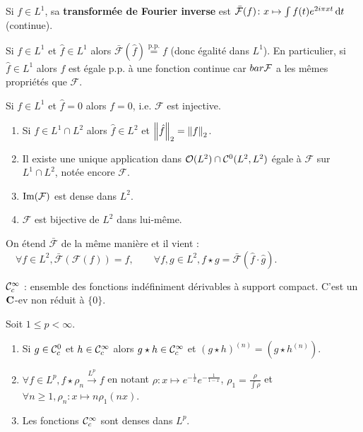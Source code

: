 \begin{defn}
	Si $f \in L^1$, sa \textbf{transformée de Fourier inverse} est $\bar{\mathcal{F}}(f) \colon x \mapsto \int f(t) e^{2i\pi xt} \mathop{}\mathopen{}\mathrm{d} t$ (continue).
\end{defn}

\begin{thm}
	Si $f \in L^1$ et $\hat{f} \in L^1$ alors $\bar{\mathcal{F}}(\hat{f}) \overset{\text{p.p.}}{=} f$ (donc égalité dans $L^1$).
	En particulier, si $\hat{f} \in L^1$ alors $f$ est égale p.p. à une fonction continue car $\\bar{\mathcal{F}}$ a les mêmes propriétés que $\mathcal{F}$.
\end{thm}

\begin{cor}
	Si $f \in L^1$ et $\hat{f} = 0$ alors $f = 0$, i.e. $\mathcal{F}$ est injective.
\end{cor}

\begin{thm}[Extension à $L^2$]
	\begin{enumerate}
		\item Si $f \in L^1 \cap L^2$ alors $\hat{f} \in L^2$ et $\left\lVert\hat{f}\right\rVert_2 = \left\lVert f\right\rVert_2$.
		\item Il existe une unique application dans $\mathcal{O}(L^2) \cap \mathcal{C}^0(L^2,L^2)$ égale à $\mathcal{F}$ sur $L^1 \cap L^2$, notée encore $\mathcal{F}$.
		\item $\operatorname{Im}(\mathcal{F})$ est dense dans $L^2$.
		\item $\mathcal{F}$ est bijective de $L^2$ dans lui-même.
	\end{enumerate}
\end{thm}

\begin{thm}
	On étend $\bar{\mathcal{F}}$ de la même manière et il vient :
	$\quad \forall f \in L^2, \bar{\mathcal{F}}(\mathcal{F}(f)) = f,\qquad
		\forall f,g \in L^2, f \star g = \bar{\mathcal{F}}(\hat{f} \cdot \hat{g})$.
\end{thm}

\begin{defn}
	$\mathcal{C}_c^\infty$ : ensemble des fonctions indéfiniment dérivables à support compact. C'est un $\mathbf{C}$-ev non réduit à $\{ 0 \}$.
\end{defn}

\begin{thm}
	Soit $1 \leq p < \infty$.
	\begin{enumerate}
		\item Si $g \in \mathcal{C}_c^0$ et $h \in \mathcal{C}_c^\infty$ alors $g \star h \in \mathcal{C}_c^\infty$ et $(g \star h)^{(n)} = \left( g \star h^{(n)} \right)$.
		\item $\forall f \in L^p, f \star \rho_n \overset{L^p}{\to} f$ en notant $\rho \colon x \mapsto e^{-\frac{1}{x}} e^{-\frac{1}{1 - x}}$, $\rho_1 = \frac{\rho}{\int \rho}$ et $\forall n \geq 1, \rho_n \colon x \mapsto n \rho_1(nx)$.
		\item Les fonctions $\mathcal{C}_c^\infty$ sont denses dans $L^p$.
	\end{enumerate}
\end{thm}

